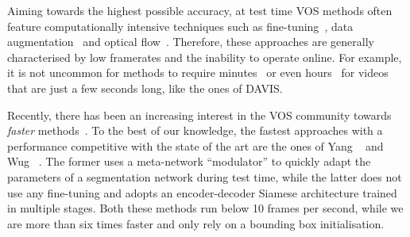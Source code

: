 Aiming towards the highest possible accuracy, at test time VOS methods often feature computationally intensive techniques such as fine-tuning~\cite{maninis2017video,perazzi2017learning,bao2018cnn,voigtlaender2017online}, data augmentation~\cite{LucidDataDreaming_CVPR17_workshops,li2018video} and optical flow~\cite{tsai2016video,bao2018cnn,perazzi2017learning,li2018video,cheng2018fast}.
Therefore, these approaches are generally characterised by low framerates and the inability to operate online.
For example, it is not uncommon for methods to require minutes~\cite{perazzi2017learning,cheng2017segflow} or even hours~\cite{tsai2016video,bao2018cnn} for videos that are just a few seconds long, like the ones of DAVIS.

Recently, there has been an increasing interest in the VOS community towards \emph{faster} methods~\cite{marki2016bilateral,wug2018fast,cheng2018fast,chen2018blazingly,jampani2017video,hu2018videomatch}.
To the best of our knowledge, the fastest approaches with a performance competitive with the state of the art are the ones of Yang \etal~\cite{Yang_2018_CVPR} and Wug \etal~\cite{wug2018fast}.
The former uses a meta-network ``modulator'' to quickly adapt the parameters of a segmentation network during test time, while the latter does not use any fine-tuning and adopts an encoder-decoder Siamese architecture trained in multiple stages.
Both these methods run below 10 frames per second, while we are more than six times faster and only rely on a bounding box initialisation.
